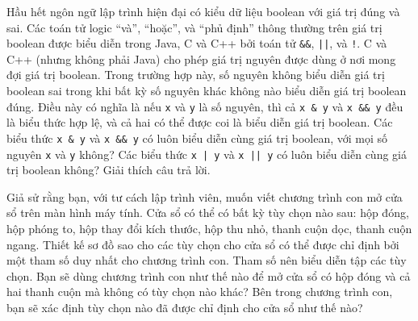 \begin{exercise}
Hầu hết ngôn ngữ lập trình hiện đại có kiểu dữ liệu boolean với giá trị đúng và sai. Các toán tử logic ``và'', ``hoặc'', và ``phủ định'' thông thường trên giá trị boolean được biểu diễn trong Java, C và C++ bởi toán tử \texttt{\&\&}, \texttt{||}, và \texttt{!}. C và C++ (nhưng không phải Java) cho phép giá trị nguyên được dùng ở nơi mong đợi giá trị boolean. Trong trường hợp này, số nguyên không biểu diễn giá trị boolean sai trong khi bất kỳ số nguyên khác không nào biểu diễn giá trị boolean đúng. Điều này có nghĩa là nếu \texttt{x} và \texttt{y} là số nguyên, thì cả \texttt{x \& y} và \texttt{x \&\& y} đều là biểu thức hợp lệ, và cả hai có thể được coi là biểu diễn giá trị boolean. Các biểu thức \texttt{x \& y} và \texttt{x \&\& y} có luôn biểu diễn cùng giá trị boolean, với mọi số nguyên \texttt{x} và \texttt{y} không? Các biểu thức \texttt{x | y} và \texttt{x || y} có luôn biểu diễn cùng giá trị boolean không? Giải thích câu trả lời.
\end{exercise}

\begin{exercise}
Giả sử rằng bạn, với tư cách lập trình viên, muốn viết chương trình con mở cửa sổ trên màn hình máy tính. Cửa sổ có thể có bất kỳ tùy chọn nào sau: hộp đóng, hộp phóng to, hộp thay đổi kích thước, hộp thu nhỏ, thanh cuộn dọc, thanh cuộn ngang. Thiết kế sơ đồ sao cho các tùy chọn cho cửa sổ có thể được chỉ định bởi một tham số duy nhất cho chương trình con. Tham số nên biểu diễn tập các tùy chọn. Bạn sẽ dùng chương trình con như thế nào để mở cửa sổ có hộp đóng và cả hai thanh cuộn mà không có tùy chọn nào khác? Bên trong chương trình con, bạn sẽ xác định tùy chọn nào đã được chỉ định cho cửa sổ như thế nào?
\end{exercise}
